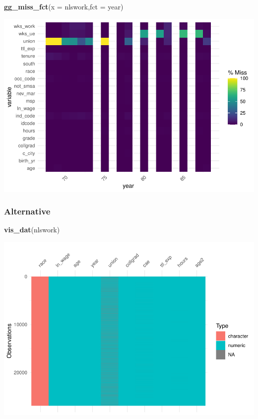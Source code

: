 \documentclass[
]{article}
\newenvironment{Shaded}{\begin{snugshade}}{\end{snugshade}}
\newcommand{\AttributeTok}[1]{\textcolor[rgb]{0.13,0.29,0.53}{#1}}
\newcommand{\FunctionTok}[1]{\textcolor[rgb]{0.13,0.29,0.53}{\textbf{#1}}}
\newcommand{\NormalTok}[1]{#1}
\begin{document}
\begin{Shaded}
\begin{Highlighting}[]
\FunctionTok{gg\_miss\_fct}\NormalTok{(}\AttributeTok{x =}\NormalTok{ nlswork,}\AttributeTok{fct =}\NormalTok{ year)}
\end{Highlighting}
\end{Shaded}

\includegraphics{RIntro_files/figure-latex/unnamed-chunk-9-4.pdf}

\hypertarget{alternative}{%
\subsubsection{Alternative}\label{alternative}}

\begin{Shaded}
\begin{Highlighting}[]
\FunctionTok{vis\_dat}\NormalTok{(nlswork)}
\end{Highlighting}
\end{Shaded}

\includegraphics{RIntro_files/figure-latex/unnamed-chunk-10-1.pdf}
\end{document}
